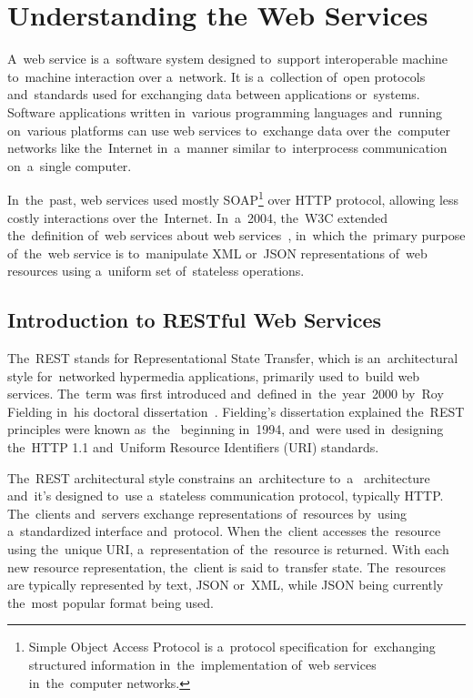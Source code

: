 \section{Understanding the Web Services}
\label{WebServices}
A~web service is a~software system designed to~support interoperable machine
to~machine interaction over a~network. It is a~collection of~open protocols
and~standards used for exchanging data between applications or~systems. Software
applications written in~various programming languages and~running on~various
platforms can use web services to~exchange data over the~computer networks like
the~Internet in~a~manner similar to~interprocess communication on~a~single
computer.

In~the~past, web services used mostly SOAP\footnote{Simple Object Access
Protocol is a~protocol specification for~exchanging structured information
in~the~implementation of~web services in~the~computer networks.} over HTTP
protocol, allowing less costly interactions over the~Internet. In~a~2004,
the~W3C extended the~definition of~web services about  web
services~\cite{W3CWebServices}, in~which the~primary purpose of~the~web service
is to~manipulate XML or~JSON representations of~web resources using a~uniform
set of~stateless operations.

\subsection{Introduction to RESTful Web Services}
The~REST stands for Representational State Transfer, which is an~architectural
style for~networked hypermedia applications, primarily used to~build web
services. The~term was first introduced and~defined in~the~year~2000 by~Roy
Fielding in~his doctoral dissertation~\cite{Fielding}. Fielding's dissertation
explained the~REST principles were known as~the~ beginning in~1994,
and~were used in~designing the~HTTP 1.1 and~Uniform Resource Identifiers (URI)
standards.

The~REST architectural style constrains an~architecture to~a~
architecture and~it's designed to~use a~stateless communication protocol,
typically HTTP. The~clients and~servers exchange representations of~resources
by~using a~standardized interface and~protocol. When the~client accesses
the~resource using the~unique URI, a~representation of~the~resource is returned.
With each new resource representation, the~client is said to~transfer state.
The~resources are typically represented by text, JSON or~XML, while JSON being
currently the~most popular format being used.

